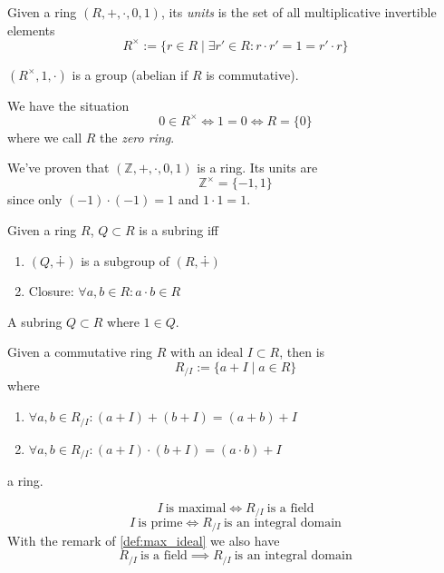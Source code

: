 \begin{definition}
   Given a ring \((R, +, \cdot, 0, 1)\), its \textit{units} is the set of all multiplicative invertible elements
   \[R^\times := \{r \in R \mid \exists r' \in R: r \cdot r' = 1 = r' \cdot r\}\]
\end{definition}
\begin{remark}
   \((R^{\times}, 1, \cdot)\) is a group (abelian if \(R\) is commutative).
\end{remark}
\begin{remark}
   We have the situation
   \[0 \in R^\times \iff 1 = 0 \iff R = \{0\}\]
   where we call \(R\) the \emph{zero ring}.
\end{remark}
\begin{example}
   We've proven that \((\mathbb{Z}, +, \cdot, 0, 1)\) is a ring.
   Its units are
   \[\mathbb{Z}^\times = \{-1, 1\}\]
   since only \((-1) \cdot (-1) = 1\) and \(1 \cdot 1 = 1\).
\end{example}

\begin{definition}[Subring]
   Given a ring \(R\), \(Q \subset R\) is a subring iff
   \begin{enumerate}[label=\roman*, align=Center]
      \item \((Q, \dotplus)\) is a subgroup of \((R, \dotplus)\)
      \item Closure: \(\forall a, b \in R: a \cdot b \in R\)
   \end{enumerate}
\end{definition}

\begin{definition}
   A subring \(Q \subset R\) where \(1 \in Q\).
\end{definition}

\begin{definition}
   Given a commutative ring \(R\) with an ideal \(I \subset R\), then is
   \[R_{/I} := \{a + I \mid a \in R\}\]
   where
   \begin{enumerate}[label=\roman*, align=Center]
      \item \(\forall a, b \in R_{/I}: (a + I) + (b + I) = (a + b) + I\)
      \item \(\forall a, b \in R_{/I}: (a + I) \cdot (b + I) = (a \cdot b) + I\)
   \end{enumerate}
   a ring.
\end{definition}
\begin{remark}
   \[I~\text{is maximal} \iff R_{/I}~\text{is a field}\] %
   \[I~\text{is prime} \iff R_{/I}~\text{is an integral domain}\]
   With the remark of \cref{def:max_ideal} we also have
   \[R_{/I}~\text{is a field} \implies R_{/I}~\text{is an integral domain}\]
\end{remark}

